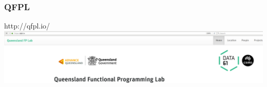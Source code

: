 \begin{frame}
\frametitle{QFPL}
\begin{block}{http://qfpl.io/}
\includegraphics[height=0.24\textheight]{image/qfpl-io.png}
\end{block}
\end{frame}



